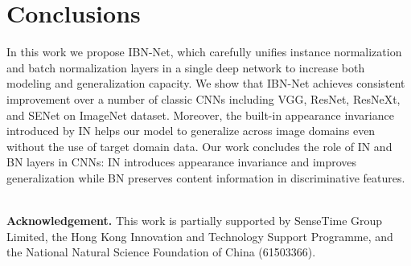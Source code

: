 \documentclass[runningheads]{llncs}
\begin{document}
\section{Conclusions}

In this work we propose IBN-Net, which carefully unifies instance normalization and batch normalization layers in a single deep network to increase both modeling and generalization capacity.
We show that IBN-Net achieves consistent improvement over a number of classic CNNs including VGG, ResNet, ResNeXt, and SENet on ImageNet dataset.
Moreover, the built-in appearance invariance introduced by IN helps our model to generalize across image domains even without the use of target domain data.
Our work concludes the role of IN and BN layers in CNNs: IN introduces appearance invariance and improves generalization while BN preserves content information in discriminative features.

~\\
\textbf{Acknowledgement.} This work is partially supported by SenseTime Group Limited, the Hong Kong Innovation and Technology Support Programme, and the National Natural Science Foundation of China (61503366).





\end{document}
